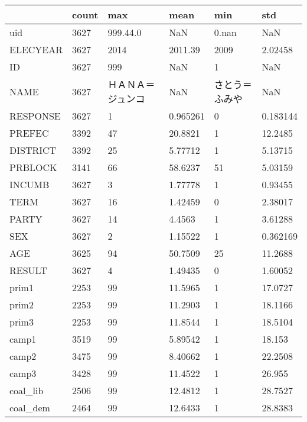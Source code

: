 \begin{tabular}{llllll}
\toprule
{} & count &        max &      mean &      min &       std \\
\midrule
uid           &  3627 &   999.44.0 &       NaN &    0.nan &       NaN \\
ELECYEAR      &  3627 &       2014 &   2011.39 &     2009 &   2.02458 \\
ID            &  3627 &        999 &       NaN &        1 &       NaN \\
NAME          &  3627 &  ＨＡＮＡ＝ジュンコ &       NaN &  さとう＝ふみや &       NaN \\
RESPONSE      &  3627 &          1 &  0.965261 &        0 &  0.183144 \\
PREFEC        &  3392 &         47 &   20.8821 &        1 &   12.2485 \\
DISTRICT      &  3392 &         25 &   5.77712 &        1 &   5.13715 \\
PRBLOCK       &  3141 &         66 &   58.6237 &       51 &   5.03159 \\
INCUMB        &  3627 &          3 &   1.77778 &        1 &   0.93455 \\
TERM          &  3627 &         16 &   1.42459 &        0 &   2.38017 \\
PARTY         &  3627 &         14 &    4.4563 &        1 &   3.61288 \\
SEX           &  3627 &          2 &   1.15522 &        1 &  0.362169 \\
AGE           &  3625 &         94 &   50.7509 &       25 &   11.2688 \\
RESULT        &  3627 &          4 &   1.49435 &        0 &   1.60052 \\
prim1         &  2253 &         99 &   11.5965 &        1 &   17.0727 \\
prim2         &  2253 &         99 &   11.2903 &        1 &   18.1166 \\
prim3         &  2253 &         99 &   11.8544 &        1 &   18.5104 \\
camp1         &  3519 &         99 &   5.89542 &        1 &    18.153 \\
camp2         &  3475 &         99 &   8.40662 &        1 &   22.2508 \\
camp3         &  3428 &         99 &   11.4522 &        1 &    26.955 \\
coal\_lib      &  2506 &         99 &   12.4812 &        1 &   28.7527 \\
coal\_dem      &  2464 &         99 &   12.6433 &        1 &   28.8383 \\

\end{tabular}
